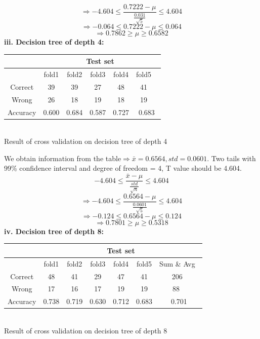 \begin{equation*}
	\Rightarrow  -4.604\leq \frac{0.7222 - \mu }{\frac{0.031}{\sqrt{5}}} \leq 4.604 
\end{equation*}
\begin{equation*}
	\Rightarrow  -0.064\leq {0.7222 - \mu } \leq 0.064
\end{equation*}
\begin{equation*}
	\Rightarrow  0.7862 \ge  {\mu } \ge  0.6582
\end{equation*}
\textbf{iii. Decision tree of depth 4:}
\begin{center}
\begin{tabular}{|c|c|c|c|c|c|}
\hline
&\multicolumn{5}{|c|}{Test set}  \\ \hline
 & fold1 & fold2 & fold3& fold4 & fold5 \ \\ \hline
Correct & 39 & 39 & 27& 48 & 41 \ \\ \hline
Wrong & 26 & 18 & 19& 18 & 19 \ \\ \hline
Accuracy & 0.600 & 0.684 &0.587 & 0.727 & 0.683 \\ \hline
\end{tabular}\\
Result of cross validation on decision tree of depth 4
\end{center}
We obtain information from the table$\Rightarrow \bar{x} = 0.6564, std = 0.0601$. Two tails with 99\% confidence interval and degree of freedom = 4, T value should be 4.604.
\begin{equation*}
	-4.604\leq \frac{\bar{x} - \mu }{\frac{std}{\sqrt{n}}} \leq 4.604 
\end{equation*}
\begin{equation*}
	\Rightarrow  -4.604\leq \frac{0.6564 - \mu }{\frac{0.0601}{\sqrt{5}}} \leq 4.604 
\end{equation*}
\begin{equation*}
	\Rightarrow  -0.124\leq {0.6564 - \mu } \leq 0.124
\end{equation*}
\begin{equation*}
	\Rightarrow  0.7801 \ge  {\mu } \ge  0.5318
\end{equation*}
\clearpage
\textbf{iv. Decision tree of depth 8:}
\begin{center}
\begin{tabular}{|c|c|c|c|c|c|c|}
\hline
&\multicolumn{6}{|c|}{Test set}  \\ \hline
 & fold1 & fold2 & fold3& fold4 & fold5 & Sum \& Avg\ \\ \hline
Correct & 48 & 41 & 29& 47 & 41 &206\ \\ \hline
Wrong & 17 & 16 & 17& 19 & 19& 88 \ \\ \hline
Accuracy & 0.738 & 0.719 &0.630 & 0.712 & 0.683& 0.701 \\ \hline
\end{tabular}\\
Result of cross validation on decision tree of depth 8
\end{center}

